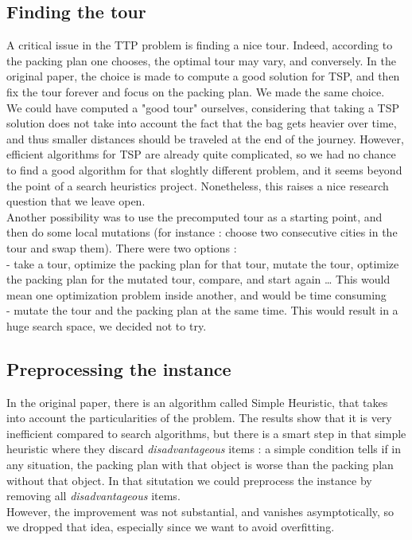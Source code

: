 \documentclass[a4paper]{article}
\begin{document}
\subsection{Finding the tour}
A critical issue in the TTP problem is finding a nice tour. Indeed, according to the packing plan one chooses, the optimal tour may vary, and conversely. In the original paper, the choice is made to compute a good solution for TSP, and then fix the tour forever and focus on the packing plan. We made the same choice.\\
We could have computed a "good tour" ourselves, considering that taking a TSP solution does not take into account the fact that the bag gets heavier over time, and thus smaller distances should be traveled at the end of the journey. However, efficient algorithms for TSP are already quite complicated, so we had no chance to find a good algorithm for that sloghtly different problem, and it seems beyond the point of a search heuristics project. Nonetheless, this raises a nice research question that we leave open.\\
Another possibility was to use the precomputed tour as a starting point, and then do some local mutations (for instance : choose two consecutive cities in the tour and swap them). There were two options :\\
- take a tour, optimize the packing plan for that tour, mutate the tour, optimize the packing plan for the mutated tour, compare, and start again … This would mean one optimization problem inside another, and would be time consuming\\
- mutate the tour and the packing plan at the same time. This would result in a huge search space, we decided not to try.
\subsection{Preprocessing the instance}
In the original paper, there is an algorithm called Simple Heuristic, that takes into account the particularities of the problem. The results show that it is very inefficient compared to search algorithms, but there is a smart step in that simple heuristic where they discard \textit{disadvantageous} items : a simple condition tells if in any situation, the packing plan with that object is worse than the packing plan without that object. In that situtation we could preprocess the instance by removing all \textit{disadvantageous} items.\\
However, the improvement was not substantial, and vanishes asymptotically, so we dropped that idea, especially since we want to avoid overfitting.
\end{document}
